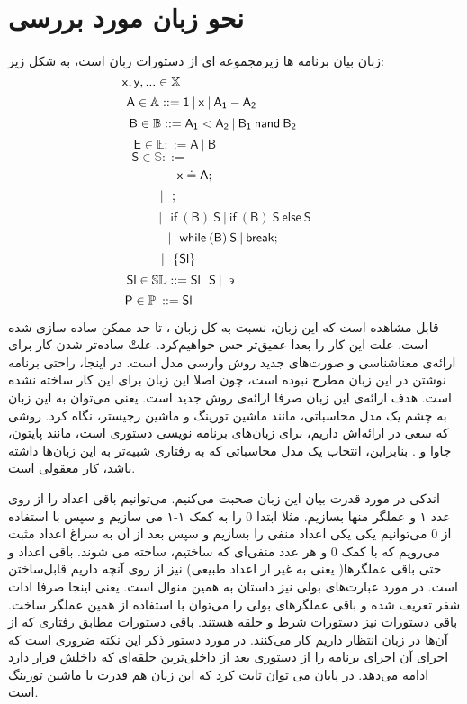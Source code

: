 \section{نحو زبان مورد بررسی‬}
زبان بیان برنامه ها زیرمجموعه ای از دستورات زبان  است، به شکل زیر:
$$\mathsf{x,y},... \in \mathbb{X}\hspace{4.65cm}$$
$$\mathsf{A} \in \mathbb{A} ::=\mathsf{1\:|\:x\:|\:A_1 - A_2\hspace{2.4cm}}$$  
$$\mathsf{B \in \mathbb{B} ::=A_1<A_2 \:|\: B_1 \: nand\: B_2\hspace{1.2cm}}$$
$$\mathsf{E \in \mathbb{E}::= A \: | \: B\hspace{4cm}}$$
$$\mathsf{S\in \mathbb{S} ::=\hspace{5cm}  }$$
$$\mathsf{x\doteq A; \hspace{2.25cm}}$$
$$\mathsf{|\:\:\:;\hspace{3.75cm}}$$
$$\mathsf{|\:\:\:if\:(B)\:S\:|\:if\:(B)\:S\:else\:S}$$
$$\mathsf{|\:\:\:while\:(B)\:S\: | \: break;\hspace{0.65cm}}$$
$$\mathsf{|\:\:\:\{Sl\}\hspace{3.15cm}}$$
$$\mathsf{Sl \in \mathbb{SL}::=Sl\:\:\:S\:|\:\backepsilon}\hspace{3.05cm}$$
$$\mathsf{P\in \mathbb{P}\:::=Sl}\hspace{4.25cm}$$

\vspace{1cm}
قابل مشاهده است که این زبان، نسبت به کل زبان ، تا حد ممکن ساده سازی شده است. علت این کار را بعدا عمیق‌تر حس خواهیم‌کرد. علتْ ساده‌تر شدن کار برای ارائه‌ی معناشناسی و صورت‌های جدید روش وارسی مدل است. در اینجا، راحتی برنامه نوشتن در این زبان مطرح نبوده است، چون اصلا این زبان برای این کار ساخته نشده است. هدف ارائه‌ی این زبان صرفا ارائه‌ی روش جدید است. یعنی می‌توان به این زبان به چشم یک مدل محاسباتی، مانند ماشین تورینگ و ماشین رجیستر، نگاه کرد. روشی که سعی در ارائه‌اش داریم، برای زبان‌های برنامه نویسی دستوری است، مانند پایتون، جاوا و . بنابراین، انتخاب یک مدل محاسباتی که به رفتاری شبیه‌تر به این زبان‌ها داشته باشد، کار معقولی است.

اندکی در مورد قدرت بیان این زبان صحبت می‌کنیم. می‌توانیم باقی اعداد را از روی عدد ۱ و عملگر منها بسازیم. مثلا ابتدا 0 را به کمک ۱-۱ می سازیم و سپس با استفاده از 0 می‌توانیم یکی یکی اعداد منفی را بسازیم و سپس بعد از آن به سراغ اعداد مثبت می‌رویم که با کمک 0 و هر عدد منفی‌ای که ساختیم، ساخته می شوند. باقی اعداد و حتی باقی عملگر‌ها( یعنی به غیر از اعداد طبیعی) نیز از روی آنچه داریم قابل‌ساختن است. در مورد عبارت‌های بولی نیز داستان به همین منوال است. یعنی اینجا صرفا ادات شفر تعریف شده و باقی عملگر‌های بولی را می‌توان با استفاده از همین عملگر ساخت. باقی دستورات نیز دستورات شرط و حلقه هستند. باقی دستورات مطابق رفتاری که از آن‌ها در زبان  انتظار داریم کار می‌کنند. در مورد دستور  ذکر این نکته ضروری است که اجرای آن اجرای برنامه را از دستوری بعد از داخلی‌ترین حلقه‌ای که  داخلش قرار دارد ادامه می‌‌دهد. در پایان می توان ثابت کرد که این زبان هم قدرت با ماشین تورینگ\cite{davis} است. 

